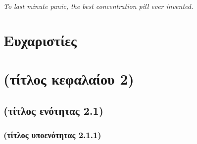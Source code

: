 \documentclass[12pt]{report}
\begin{document}
\setcounter{page}{2}


\chapter*{}
\thispagestyle{plain} \null
\vfill
\begin{flushright}
	\textit{To last minute panic, the best concentration pill ever invented.}
	\par\medskip
\end{flushright}
\vfill\vfill






\chapter*{Ευχαριστίες}


\tableofcontents
\thispagestyle{plain}


\listoffigures
\thispagestyle{plain}


\listoftables


\digital
{}
\else
{}
\fi






\chapter{(τίτλος κεφαλαίου 2)}



\section{(τίτλος ενότητας 2.1)}


\subsection{(τίτλος υποενότητας 2.1.1)}




\cite{*}

\end{document}
